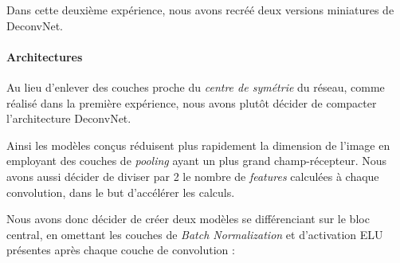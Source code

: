 \documentclass[a4paper, 11pt]{report}
\begin{document}
Dans cette deuxième expérience, nous avons recréé deux versions miniatures de DeconvNet.
\paragraph{Architectures}
Au lieu d'enlever des couches proche du \emph{centre de symétrie} du réseau, comme réalisé dans la première expérience, nous avons plutôt décider de compacter l'architecture DeconvNet.

Ainsi les modèles conçus réduisent plus rapidement la dimension de l'image en employant des couches de \emph{pooling} ayant un plus grand champ-récepteur.
Nous avons aussi décider de diviser par 2 le nombre de \emph{features} calculées à chaque convolution, dans le but d’accélérer les calculs.

Nous avons donc décider de créer deux modèles se différenciant sur le bloc central, en omettant les couches de \emph{Batch Normalization} et d'activation ELU présentes après chaque couche de convolution  :
\end{document}
